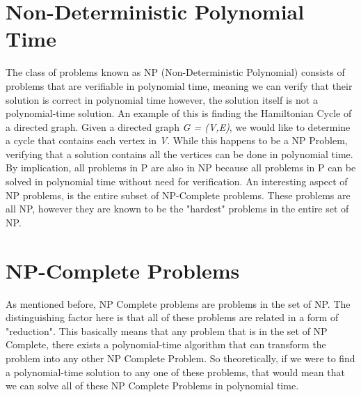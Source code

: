 \documentclass{article}
\begin{document}
\section*{Non-Deterministic Polynomial Time}
    The class of problems known as NP (Non-Deterministic Polynomial) consists of problems that are verifiable in polynomial time, meaning we can verify that their solution is correct in polynomial time however, the solution itself is not a polynomial-time solution. An example of this is finding the Hamiltonian Cycle of a directed graph. Given a directed graph \textit{G = (V,E)}, we would like to determine a cycle that contains each vertex in \textit{V}. While this happens to be a NP Problem, verifying that a solution contains all the vertices can be done in polynomial time. By implication, all problems in P are also in NP because all problems in P can be solved in polynomial time without need for verification. An interesting aspect of NP problems, is the entire subset of NP-Complete problems. These problems are all NP, however they are known to be the "hardest" problems in the entire set of NP\cite{clrs}. 
\section*{NP-Complete Problems}
    As mentioned before, NP Complete problems are problems in the set of NP. The distinguishing factor here is that all of these problems are related in a form of "reduction". This basically means that any problem that is in the set of NP Complete, there exists a polynomial-time algorithm that can transform the problem into any other NP Complete Problem. So theoretically, if we were to find a polynomial-time solution to any one of these problems, that would mean that we can solve all of these NP Complete Problems in polynomial time\cite{clrs}.
\end{document}
